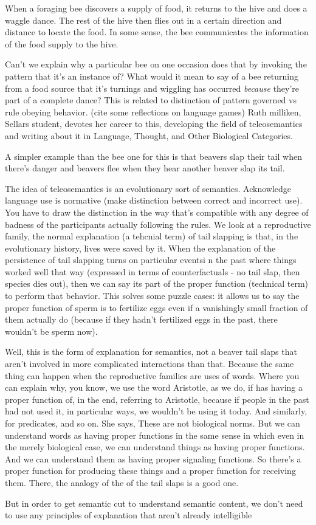 When a foraging bee discovers a supply of food, it returns to the hive and does
a waggle dance. The rest of the hive then flies out in a certain direction and
distance to locate the food. In some sense, the bee communicates the information
of the food supply to the hive.

Can't we explain why a particular bee on one
occasion does that by invoking the pattern that
it's an instance of? What would it mean to say of
a bee returning from a food source that it's
turnings and wiggling has occurred \emph{because}
they're part of a complete dance? This is related
to distinction of pattern governed vs rule
obeying behavior. (cite some reflections on
language games) Ruth milliken, Sellars student,
devotes her career to this, developing the field
of teleosemantics and writing about it in
Language, Thought, and Other Biological
Categories.

A simpler example than the bee one for this is
that beavers slap their tail when there's danger
and beavers flee when they hear another beaver
slap its tail.

The idea of teleosemantics is an evolutionary
sort of semantics. Acknowledge language use is
normative (make distinction between correct and
incorrect use). You have to draw the distinction
in the way that's compatible with any degree of
badness of the participants actually following
the rules. We look at a reproductive family, the
normal explanation (a tehcnial term) of tail
slapping is that, in the evolutionary history,
lives were saved by it. When the explanation of
the persistence of tail slapping turns on
particular eventsi n the past where things worked
well that way (expressed in terms of
counterfactuals - no tail slap, then species dies
out), then we can say its part of the proper
function (technical term) to perform that
behavior. This  solves some puzzle cases: it
allows us to say the proper function of sperm is
to fertilize eggs even if a vanishingly small
fraction of them actually do (because if they
hadn't fertilized eggs in the past, there
wouldn't be sperm now).

Well, this is the form of explanation for semantics, not a beaver tail slaps
that aren't involved in more complicated interactions than that. Because the
same thing can happen when the reproductive families are uses of words. Where
you can explain why, you know, we use the word Aristotle, as we do, if has
having a proper function of, in the end, referring to Aristotle, because if
people in the past had not used it, in particular ways, we wouldn't be using
it today. And similarly, for predicates, and so on. She says, These are not
biological norms. But we can understand words as having proper functions in the
same sense in which even in the merely biological case, we can understand things
as having proper functions. And we can understand them as having proper
signaling functions. So there's a proper function for producing these things
and a proper function for receiving them. There, the analogy of the of the tail
slaps is a good one.

But in order to get semantic cut to understand semantic content, we don't need
to use any principles of explanation that aren't already intelligible

